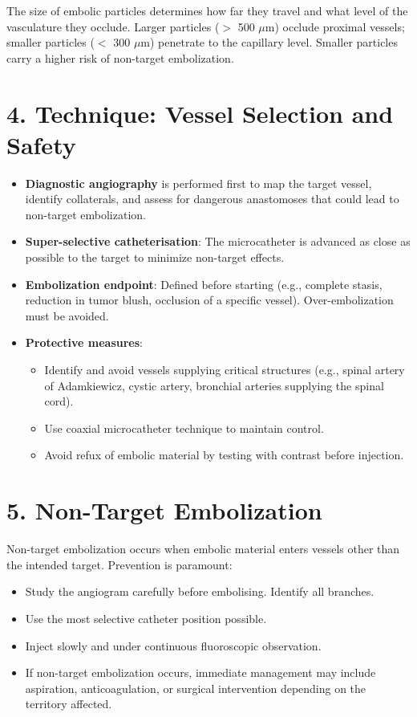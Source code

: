 \begin{pearlbox}
The size of embolic particles determines how far they travel and what level of the vasculature they occlude. Larger particles ($>$ 500 $\mu$m) occlude proximal vessels; smaller particles ($<$ 300 $\mu$m) penetrate to the capillary level. Smaller particles carry a higher risk of non-target embolization.
\end{pearlbox}


\section{4. Technique: Vessel Selection and Safety}

\begin{itemize}
  \item \textbf{Diagnostic angiography} is performed first to map the target vessel, identify collaterals, and assess for dangerous anastomoses that could lead to non-target embolization.
  \item \textbf{Super-selective catheterisation}: The microcatheter is advanced as close as possible to the target to minimize non-target effects.
  \item \textbf{Embolization endpoint}: Defined before starting (e.g., complete stasis, reduction in tumor blush, occlusion of a specific vessel). Over-embolization must be avoided.
  \item \textbf{Protective measures}:
    \begin{itemize}
      \item Identify and avoid vessels supplying critical structures (e.g., spinal artery of Adamkiewicz, cystic artery, bronchial arteries supplying the spinal cord).
      \item Use coaxial microcatheter technique to maintain control.
      \item Avoid refux of embolic material by testing with contrast before injection.
    \end{itemize}
\end{itemize}

\section{5. Non-Target Embolization}

Non-target embolization occurs when embolic material enters vessels other than the intended target. Prevention is paramount:
\begin{itemize}
  \item Study the angiogram carefully before embolising. Identify all branches.
  \item Use the most selective catheter position possible.
  \item Inject slowly and under continuous fluoroscopic observation.
  \item If non-target embolization occurs, immediate management may include aspiration, anticoagulation, or surgical intervention depending on the territory affected.
\end{itemize}

